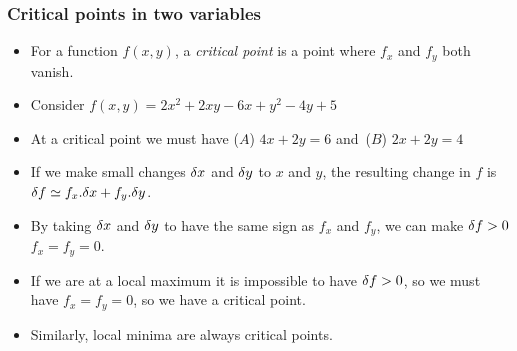 \documentclass[9pt]{beamer}
\begin{document}
\begin{frame}[t]
 \frametitle{Critical points in two variables}
 
 \begin{itemize}
  \item<1-> For a function $f(x,y)$, a \emph{critical point} is a
   point where $f_x$ and $f_y$ both vanish.
  \item<2-> Consider $f(x,y)=2x^2+2xy-6x+y^2-4y+5$
  \item<5-> At a critical point we must have ($A$) $4x+2y=6$ and~($B$)
   $2x+2y=4$ 
  \item<9-> If we make small changes $\delta x$ and $\delta y$ to $x$ and
   $y$, the resulting change in $f$ is 
   $\delta f\simeq f_x.\delta x+f_y.\delta y$.  
  \item<10-> By taking $\delta x$ and $\delta y$ to have the same sign as
   $f_x$ and $f_y$, we can make $\delta f>0$  $f_x=f_y=0$.
  \item<11-> If we are at a local maximum it is impossible to have
   $\delta f>0$, so we must have $f_x=f_y=0$, so we have a critical
   point. 
  \item<12-> Similarly, local minima are always critical points.
 \end{itemize}
\end{frame}
\end{document}

